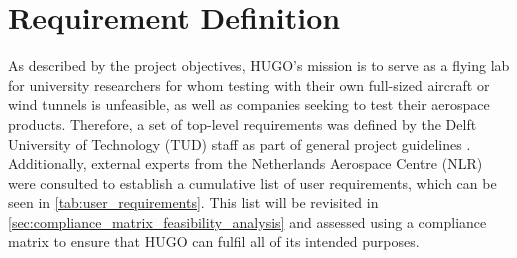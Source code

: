 \section{Requirement Definition}
\label{sec:user_requirements}
As described by the project objectives, HUGO's mission is to serve as a flying lab for university researchers for whom testing with their own full-sized aircraft or wind tunnels is unfeasible, as well as companies seeking to test their aerospace products. Therefore, a set of top-level requirements was defined by the Delft University of Technology (TUD) staff as part of general project guidelines \cite{Castro2026}. Additionally, external experts from the Netherlands Aerospace Centre (NLR) were consulted to establish a cumulative list of user requirements, which can be seen in \autoref{tab:user_requirements}. This list will be revisited in \autoref{sec:compliance_matrix_feasibility_analysis} and assessed using a compliance matrix to ensure that HUGO can fulfil all of its intended purposes.



